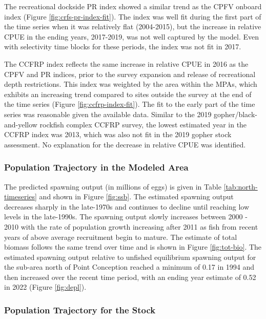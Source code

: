 \documentclass[11pt,
  letterpaper,
]{article}
\begin{document}
The recreational dockside PR index showed a similar trend as the CPFV onboard index (Figure \ref{fig:crfs-pr-index-fit}). The index was well fit during the first part of the time series when it was relatively flat (2004-2015), but the increase in relative CPUE in the ending years, 2017-2019, was not well captured by the model. Even with selectivity time blocks for these periods, the index was not fit in 2017.

The CCFRP index reflects the same increase in relative CPUE in 2016 as the CPFV and PR indices, prior to the survey expansion and release of recreational depth restrictions. This index was weighted by the area within the MPAs, which exhibits an increasing trend compared to sites outside the survey at the end of the time series (Figure \ref{fig:ccfrp-index-fit}). The fit to the early part of the time series was reasonable given the available data. Similar to the 2019 gopher/black-and-yellow rockfish complex CCFRP survey, the lowest estimated year in the CCFRP index was 2013, which was also not fit in the 2019 gopher stock assessment. No explanation for the decrease in relative CPUE was identified.

\subsubsection{Population Trajectory in the Modeled Area}\label{population-trajectory-in-the-modeled-area}

The predicted spawning output (in millions of eggs) is given in Table \ref{tab:north-timeseries} and shown in Figure \ref{fig:ssb}. The estimated spawning output decreases sharply in the late-1970s and continues to decline until reaching low levels in the late-1990s. The spawning output slowly increases between 2000 - 2010 with the rate of population growth increasing after 2011 as fish from recent years of above average recruitment begin to mature. The estimate of total biomass follows the same trend over time and is shown in Figure \ref{fig:tot-bio}. The estimated spawning output relative to unfished equilibrium spawning output for the sub-area north of Point Conception reached a minimum of 0.17 in 1994 and then increased over the recent time period, with an ending year estimate of 0.52 in 2022 (Figure \ref{fig:depl}).

\subsubsection{Population Trajectory for the Stock}\label{population-trajectory-for-the-stock}
\end{document}
